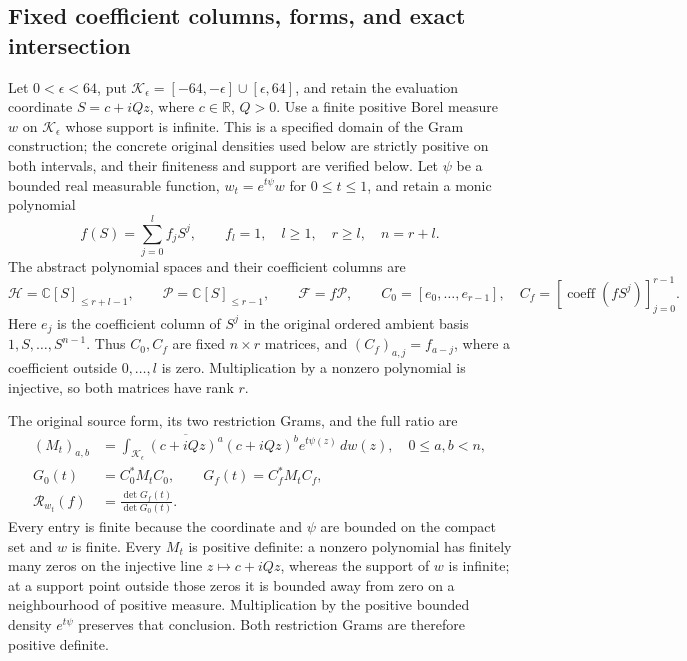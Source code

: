 \documentclass[11pt,a4paper]{article}
\begin{document}
\subsection{Fixed coefficient columns, forms, and exact intersection}
Let $0<\epsilon<64$, put
$\mathcal K_\epsilon=[-64,-\epsilon]\cup[\epsilon,64]$, and retain the
evaluation coordinate $S=c+iQz$, where $c\in\mathbb R$, $Q>0$.
Use a finite positive Borel measure $w$ on $\mathcal K_\epsilon$ whose
support is infinite. This is a specified domain of the Gram construction;
the concrete original densities used below are strictly positive on both
intervals, and their finiteness and support are verified below.
Let $\psi$ be a bounded real measurable function, $w_t=e^{t\psi}w$ for
$0\leq t\leq1$, and retain a monic polynomial
\[
 f(S)=\sum_{j=0}^l f_jS^j,\qquad f_l=1,\quad
 l\geq1,\quad r\geq l,\quad n=r+l.
 \tag{CTR1}
\]
The abstract polynomial spaces and their coefficient columns are
\[
 \mathcal H=\mathbb C[S]_{\leq r+l-1},\qquad
 \mathcal P=\mathbb C[S]_{\leq r-1},\qquad
 \mathcal F=f\mathcal P,\qquad
 C_0=[e_0,\ldots,e_{r-1}],\quad
 C_f=[\operatorname{coeff}(fS^j)]_{j=0}^{r-1}.
 \tag{CTR2}
\]
Here $e_j$ is the coefficient column of $S^j$ in the original ordered
ambient basis $1,S,\ldots,S^{n-1}$. Thus $C_0,C_f$ are fixed $n\times r$
matrices, and $(C_f)_{a,j}=f_{a-j}$, where a coefficient outside $0,\ldots,l$
is zero. Multiplication by a nonzero polynomial is injective, so both
matrices have rank $r$.

The original source form, its two restriction Grams, and the full ratio are
\[
 \begin{split}
 (M_t)_{a,b}&=\int_{\mathcal K_\epsilon}
        \overline{(c+iQz)^a}(c+iQz)^b e^{t\psi(z)}\,dw(z),\quad 0\leq a,b<n,\\
 G_0(t)&=C_0^*M_tC_0,\qquad G_f(t)=C_f^*M_tC_f,\\
 \mathcal R_{w_t}(f)&=\frac{\det G_f(t)}{\det G_0(t)}.
 \end{split}
 \tag{CTR3}
\]
Every entry is finite because the coordinate and $\psi$ are bounded on
the compact set and $w$ is finite. Every $M_t$ is positive definite:
a nonzero polynomial has finitely many zeros on the injective line
$z\mapsto c+iQz$, whereas the support of $w$ is infinite; at a support
point outside those zeros it is bounded away from zero on a neighbourhood
of positive measure. Multiplication by the positive bounded density
$e^{t\psi}$ preserves that conclusion. Both restriction Grams are
therefore positive definite.
\end{document}
